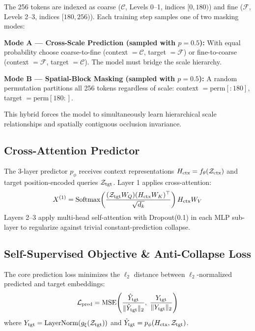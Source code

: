 \documentclass[10pt,twocolumn,letterpaper]{article}
\begin{document}
The 256 tokens are indexed as coarse ($\mathcal{C}$, Levels 0–1, indices $[0,\!180)$) and fine ($\mathcal{F}$, Levels 2–3, indices $[180,\!256)$). Each training step samples one of two masking modes:

\textbf{Mode A — Cross-Scale Prediction (sampled with $p\!=\!0.5$):} With equal probability choose coarse-to-fine (context $= \mathcal{C}$, target $= \mathcal{F}$) or fine-to-coarse (context $= \mathcal{F}$, target $= \mathcal{C}$). The model must bridge the scale hierarchy.

\textbf{Mode B — Spatial-Block Masking (sampled with $p\!=\!0.5$):} A random permutation partitions all 256 tokens regardless of scale: context $= \text{perm}[{:}180]$, target $= \text{perm}[180{:}]$.

This hybrid forces the model to simultaneously learn hierarchical scale relationships and spatially contiguous occlusion invariance.

\subsection{Cross-Attention Predictor}
\label{sec:predictor}

The 3-layer predictor $p_\phi$ receives context representations $H_{\rm ctx} = f_\theta(\mathcal{Z}_{\rm ctx})$ and target position-encoded queries $\mathcal{Z}_{\rm tgt}$. Layer 1 applies cross-attention:
\begin{equation}
X^{(1)} = \operatorname{Softmax}\!\left( \frac{(\mathcal{Z}_{\rm tgt} W_Q)(H_{\rm ctx} W_K)^\top}{\sqrt{d_k}} \right) H_{\rm ctx} W_V
\end{equation}
Layers 2–3 apply multi-head self-attention with Dropout(0.1) in each MLP sub-layer to regularize against trivial constant-prediction collapse.

\subsection{Self-Supervised Objective \& Anti-Collapse Loss}
\label{sec:loss}

The core prediction loss minimizes the $\ell_2$ distance between $\ell_2$-normalized predicted and target embeddings:
\begin{equation}
\mathcal{L}_{\rm pred} = \operatorname{MSE}\!\left( \frac{\hat{Y}_{\rm tgt}}{\|\hat{Y}_{\rm tgt}\|_2},\; \frac{Y_{\rm tgt}}{\|Y_{\rm tgt}\|_2} \right)
\end{equation}
where $Y_{\rm tgt} = \operatorname{LayerNorm}(g_\xi(\mathcal{Z}_{\rm tgt}))$ and $\hat{Y}_{\rm tgt} = p_\phi(H_{\rm ctx}, \mathcal{Z}_{\rm tgt})$.
\end{document}
